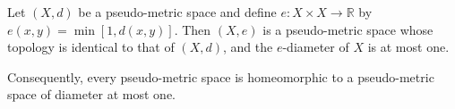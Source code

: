 Let $(X,d)$ be a pseudo-metric space and define $e : X \times X \to \mathbb{R}$ by $e(x,y) = \min[1, d(x,y)]$. Then $(X,e)$ is a pseudo-metric space whose topology is identical to that of $(X,d)$, and the $e$-diameter of $X$ is at most one.

Consequently, every pseudo-metric space is homeomorphic to a pseudo-metric space of diameter at most one.
